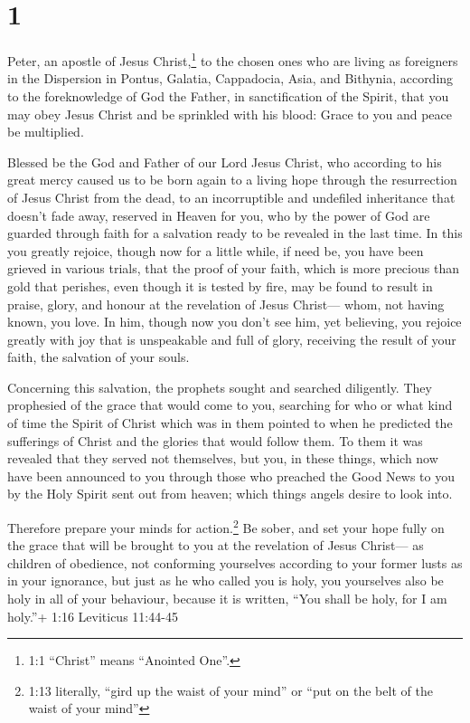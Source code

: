 \hypertarget{section}{%
\section{1}\label{section}}

 Peter, an apostle of Jesus Christ,\footnote{1:1 ``Christ''
  means ``Anointed One''.} to the chosen ones who are living as
foreigners in the Dispersion in Pontus, Galatia, Cappadocia, Asia, and
Bithynia,  according to the foreknowledge of God the Father,
in sanctification of the Spirit, that you may obey Jesus Christ and be
sprinkled with his blood: Grace to you and peace be multiplied.

 Blessed be the God and Father of our Lord Jesus Christ, who
according to his great mercy caused us to be born again to a living hope
through the resurrection of Jesus Christ from the dead,  to
an incorruptible and undefiled inheritance that doesn't fade away,
reserved in Heaven for you,  who by the power of God are
guarded through faith for a salvation ready to be revealed in the last
time.  In this you greatly rejoice, though now for a little
while, if need be, you have been grieved in various trials, 
that the proof of your faith, which is more precious than gold that
perishes, even though it is tested by fire, may be found to result in
praise, glory, and honour at the revelation of Jesus Christ---
 whom, not having known, you love. In him, though now you
don't see him, yet believing, you rejoice greatly with joy that is
unspeakable and full of glory,  receiving the result of your
faith, the salvation of your souls.

 Concerning this salvation, the prophets sought and
searched diligently. They prophesied of the grace that would come to
you,  searching for who or what kind of time the Spirit of
Christ which was in them pointed to when he predicted the sufferings of
Christ and the glories that would follow them.  To them it
was revealed that they served not themselves, but you, in these things,
which now have been announced to you through those who preached the Good
News to you by the Holy Spirit sent out from heaven; which things angels
desire to look into.

 Therefore prepare your minds for action.\footnote{1:13
  literally, ``gird up the waist of your mind'' or ``put on the belt of
  the waist of your mind''} Be sober, and set your hope fully on the
grace that will be brought to you at the revelation of Jesus Christ---
 as children of obedience, not conforming yourselves
according to your former lusts as in your ignorance,  but
just as he who called you is holy, you yourselves also be holy in all of
your behaviour,  because it is written, ``You shall be
holy, for I am holy.''+ 1:16 Leviticus 11:44-45

